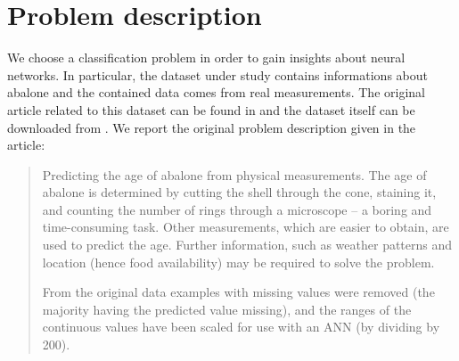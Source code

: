 \documentclass[10pt,a4paper]{article}
\begin{document}
\title{\rmfamily\normalfont{}} 
    \author{} \date{\today}
    
    \maketitle

    \begin{abstract}
      This article collects the work I did in order to support my
      Neural Network course final exam. The goal is to study neural networks
      using different training functions in order to test them against a dataset
      which holds datas about abalone. This short document describes our experience:
      we outline the problem and its application environment, the dataset used in
      experiments and a comparison of classification's results by different training functions.
      \end{abstract}
       
     

    \section{Problem description}
    
    We choose a classification problem in order to gain insights about neural networks.
    In particular, the dataset under study contains informations about abalone and
    the contained data comes from real measurements. The original article related to this
    dataset can be found in \cite{Nash-Sellers-Talbot-Cawthorn-Ford} and the dataset itself
    can be downloaded from \cite{ml-berkeley-dataset-url}. We report the original 
    problem description given in the article:
    \begin{quote}
    Predicting the age of abalone from physical measurements.  The age of
    abalone is determined by cutting the shell through the cone, staining it,
    and counting the number of rings through a microscope -- a boring and
    time-consuming task.  Other measurements, which are easier to obtain, are
    used to predict the age.  Further information, such as weather patterns
    and location (hence food availability) may be required to solve the problem.

    From the original data examples with missing values were removed (the
     majority having the predicted value missing), and the ranges of the
    continuous values have been scaled for use with an ANN (by dividing by 200).
    \end{quote}
\end{document}
